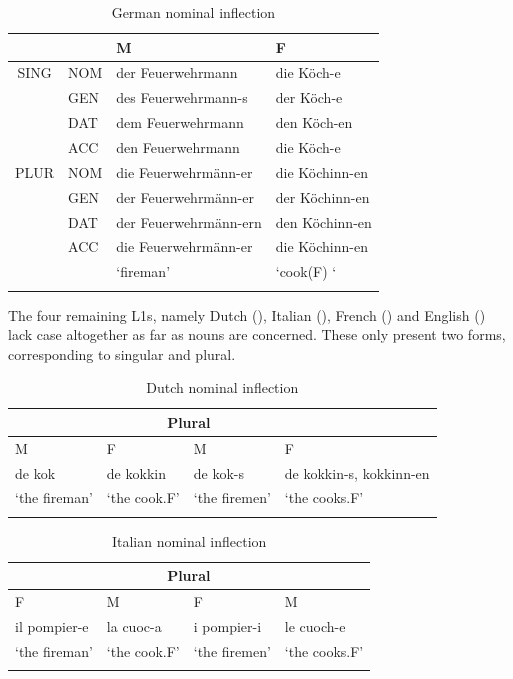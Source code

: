 \begin{table}
    \begin{tabularx}{\textwidth}{lXll}
    \lsptoprule
        \multicolumn{1}{c}{} &  & M & F\\
    \midrule
        \multicolumn{1}{c}{SING} & NOM & der Feuerwehrmann & die Köch-e\\
        & GEN & des Feuerwehrmann-s & der Köch-e\\
         & DAT & dem Feuerwehrmann & den Köch-en\\
         & ACC & den Feuerwehrmann & die Köch-e\\
        \multicolumn{1}{c}{PLUR} & NOM & die Feuerwehrmänn-er & die Köchinn-en\\
        & GEN & der Feuerwehrmänn-er & der Köchinn-en\\
         & DAT & der Feuerwehrmänn-ern & den Köchinn-en\\
         & ACC & die Feuerwehrmänn-er & die Köchinn-en\\
        \multicolumn{1}{c}{} &  & ‘fireman’ & ‘cook(F) ‘\\
\lspbottomrule
    \end{tabularx}
    \caption{German nominal inflection}
    \label{tab:02:2}
\end{table}

The four remaining L1s, namely Dutch (), Italian (), French () and English () lack case altogether as far as nouns are concerned. These only present two forms, corresponding to singular and plural.

\begin{table}
    \begin{tabularx}{\textwidth}{ll@{\hspace{1cm}}ll}
    \lsptoprule
        \multicolumn{2}{c}{Singular} & \multicolumn{2}{c}{Plural}\\
    \midrule
        M & F & M & F\\
        de kok & de kokkin & de kok-s & de kokkin-s, kokkinn-en\\
        ‘the fireman’ & ‘the cook.F’ & ‘the firemen’ & ‘the cooks.F’\\
\lspbottomrule
    \end{tabularx}
    \caption{Dutch nominal inflection}
    \label{tab:02:3}
\end{table}

\begin{table}
    \begin{tabularx}{\textwidth}{ll@{\hspace{1cm}}ll}
    \lsptoprule
        \multicolumn{2}{c}{Singular} & \multicolumn{2}{c}{Plural}\\
    \midrule
        F & M & F & M\\
        il pompier-e & la cuoc-a & i pompier-i & le cuoch-e \\
        ‘the fireman’ & ‘the cook.F’ & ‘the firemen’ & ‘the cooks.F’\\
\lspbottomrule
    \end{tabularx}
    \caption{Italian nominal inflection}
    \label{tab:02:4}
\end{table}

